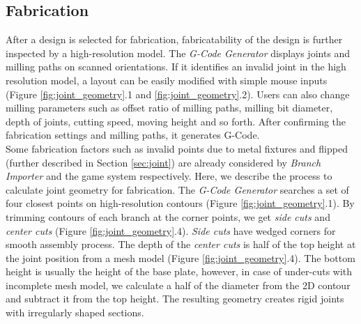 \subsection{Fabrication}
\label{sec:fabrication}
After a design is selected for fabrication, fabricatability of the design is further inspected by a high-resolution model.
The \textit{G-Code Generator} displays joints and milling paths on scanned orientations.
If it identifies an invalid joint in the high resolution model, a layout can be easily modified with simple mouse inputs (Figure \ref{fig:joint_geometry}.1 and \ref{fig:joint_geometry}.2).
Users can also change milling parameters such as offset ratio of milling paths, milling bit diameter, depth of joints, cutting speed, moving height and so forth.
After confirming the fabrication settings and milling paths, it generates G-Code.\\

Some fabrication factors such as invalid points due to metal fixtures and flipped (further described in Section \ref{sec:joint}) are already considered by \textit{Branch Importer} and the game system respectively.
Here, we describe the process to calculate joint geometry for fabrication.
The \textit{G-Code Generator} searches a set of four closest points on high-resolution contours (Figure \ref{fig:joint_geometry}.1).
By trimming contours of each branch at the corner points, we get \textit{side cuts} and \textit{center cuts} (Figure \ref{fig:joint_geometry}.4).
\textit{Side cuts} have wedged corners for smooth assembly process.
The depth of the \textit{center cuts} is half of the top height at the joint position from a mesh model (Figure \ref{fig:joint_geometry}.4).
The bottom height is usually the height of the base plate, however, in case of under-cuts with incomplete mesh model, we calculate a half of the diameter from the 2D contour and subtract it from the top height.
The resulting geometry creates rigid joints with irregularly shaped sections.

